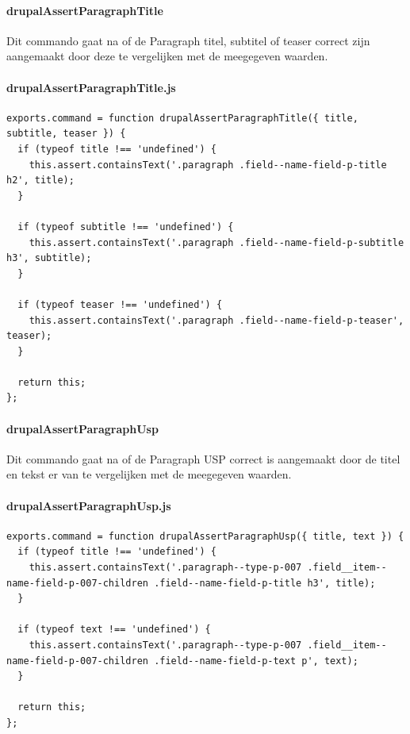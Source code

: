 \clearpage
\paragraph{drupalAssertParagraphTitle}
\label{commando9}
Dit commando gaat na of de Paragraph titel, subtitel of teaser correct zijn aangemaakt door deze te vergelijken met de meegegeven waarden.
\paragraph{drupalAssertParagraphTitle.js}
\begin{lstlisting}[breaklines=true]
exports.command = function drupalAssertParagraphTitle({ title, subtitle, teaser }) {
  if (typeof title !== 'undefined') {
    this.assert.containsText('.paragraph .field--name-field-p-title h2', title);
  }

  if (typeof subtitle !== 'undefined') {
    this.assert.containsText('.paragraph .field--name-field-p-subtitle h3', subtitle);
  }

  if (typeof teaser !== 'undefined') {
    this.assert.containsText('.paragraph .field--name-field-p-teaser', teaser);
  }
  
  return this;
};
\end{lstlisting}


\clearpage
\paragraph{drupalAssertParagraphUsp}
\label{commando10}
Dit commando gaat na of de Paragraph USP correct is aangemaakt door de titel en tekst er van te vergelijken met de meegegeven waarden.
\paragraph{drupalAssertParagraphUsp.js}
\begin{lstlisting}[breaklines=true]
exports.command = function drupalAssertParagraphUsp({ title, text }) {
  if (typeof title !== 'undefined') {
    this.assert.containsText('.paragraph--type-p-007 .field__item--name-field-p-007-children .field--name-field-p-title h3', title);
  }

  if (typeof text !== 'undefined') {
    this.assert.containsText('.paragraph--type-p-007 .field__item--name-field-p-007-children .field--name-field-p-text p', text);
  }

  return this;
};
\end{lstlisting}


